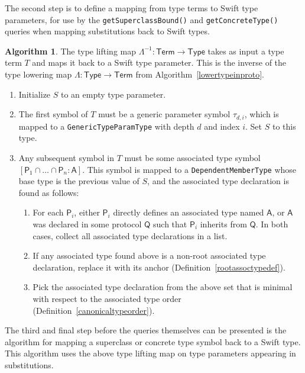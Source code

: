 \documentclass[a4paper,headsepline,bibliography=totoc,toc=flat,fleqn,twoside=semi]{scrbook}
\theoremstyle{definition}
\theoremstyle{definition}
\theoremstyle{definition}
\newtheorem{algorithm}{Algorithm}[chapter]
\newcommand{\namesym}[1]{\mathsf{#1}}
\newcommand{\proto}[1]{\bm{\mathsf{#1}}}
\begin{document}
The second step is to define a mapping from type terms to Swift type parameters, for use by the \texttt{getSuperclassBound()} and \texttt{getConcreteType()} queries when mapping substitutions back to Swift types.
\begin{algorithm} The type lifting map $\Lambda^{-1}:\namesym{Term}\rightarrow\namesym{Type}$ takes as input
a type term $T$ and maps it back to a Swift type parameter. This is the inverse of the type lowering
map $\Lambda\colon\namesym{Type}\rightarrow\namesym{Term}$ from Algorithm~\ref{lowertypeinproto}.
\begin{enumerate}
\item Initialize $S$ to an empty type parameter.
\item The first symbol of $T$ must be a generic parameter symbol $\tau_{d,i}$, which is mapped to a
\texttt{GenericTypeParamType} with depth $d$ and index $i$. Set $S$ to this type.
\item Any subsequent symbol in $T$ must be some associated type symbol
$[\proto{P}_1\cap\ldots\cap\proto{P}_n\colon\namesym{A}]$. This symbol is mapped to a
\texttt{DependentMemberType} whose base type is the previous value of $S$, and the associated type
declaration is found as follows:
\begin{enumerate}
\item For each $\proto{P}_i$, either $\proto{P}_i$ directly defines an associated type named
$\namesym{A}$, or $\namesym{A}$ was declared in some protocol $\proto{Q}$ such that $\proto{P}_i$
inherits from $\proto{Q}$. In both cases, collect all associated type declarations in a list.
\item If any associated type found above is a non-root associated type declaration, replace it with
its anchor (Definition~\ref{rootassoctypedef}).
\item Pick the associated type declaration from the above set that is minimal with respect to the
associated type order (Definition~\ref{canonicaltypeorder}).
\end{enumerate}
\end{enumerate}
\end{algorithm}
The third and final step before the queries themselves can be presented is the algorithm for mapping a superclass or concrete type symbol back to a Swift type. This algorithm uses the above type lifting map on type parameters appearing in substitutions.
\end{document}
